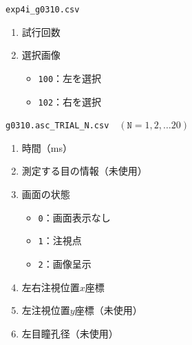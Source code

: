 \begin{center}
    \begin{framed}
        \begin{minipage}[t][]{.23\textwidth}
            \begin{center}
                \texttt{exp4i\_g0310.csv}
            \end{center}
            \begin{enumerate}
                \renewcommand{\labelenumi}{\theenumi 列目}
                \item 試行回数
                \item 選択画像
                      \begin{itemize}
                          \setlength{\leftskip}{-2em}
                          \item \texttt{100}：左を選択
                          \item \texttt{102}：右を選択
                      \end{itemize}
            \end{enumerate}
        \end{minipage}
        \begin{minipage}[t]{.48\textwidth}
            \begin{center}
                \texttt{g0310.asc\_TRIAL\_N.csv}\ \ \((\texttt{N}={1,2,\dots 20})\)
            \end{center}
            \begin{enumerate}
                \renewcommand{\labelenumi}{\theenumi 列目}
                \item 時間（ms）
                \item 測定する目の情報（未使用）
                \item 画面の状態
                      \begin{itemize}
                          \setlength{\leftskip}{-2em}
                          \item \texttt{0}：画面表示なし
                          \item \texttt{1}：注視点
                          \item \texttt{2}：画像呈示
                      \end{itemize}
                \item 左右注視位置\(x\)座標
                \item 左注視位置\(y\)座標（未使用）
                \item 左目瞳孔径（未使用）
            \end{enumerate}

\end{minipage}
\end{framed}
\end{center}
